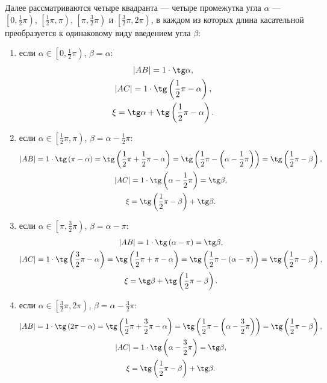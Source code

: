 Далее рассматриваются четыре квадранта --- четыре промежутка угла $\alpha$ --- $\left [ 0, \frac{1}{2} \pi \right )$, $\left [ \frac{1}{2} \pi, \pi \right )$,
$\left [ \pi, \frac{3}{2} \pi \right )$ и $\left [ \frac{3}{2} \pi, 2 \pi \right )$, в каждом из которых длина касательной преобразуется к одинаковому виду введением
угла $\beta$:
\begin{enumerate}
    \item если $\alpha \in \left [ 0, \frac{1}{2} \pi \right )$, $\beta = \alpha$:
    \begin{gather}
        \modulus{AB} = 1 \cdot \tg \alpha, \\
        \modulus{AC} = 1 \cdot \tg \left ( \frac{1}{2} \pi - \alpha \right ) , \\
        \xi = \tg \alpha + \tg \left ( \frac{1}{2} \pi - \alpha \right ).
    \end{gather}

    \item если $\alpha \in \left [ \frac{1}{2} \pi, \pi \right )$, $\beta = \alpha - \frac{1}{2} \pi$:
    \begin{gather}
        \modulus{AB} = 1 \cdot \tg \left ( \pi - \alpha \right ) = \tg \left ( \frac{1}{2} \pi + \frac{1}{2} \pi - \alpha \right ) = \tg \left ( \frac{1}{2} \pi - \left ( \alpha - \frac{1}{2} \pi \right ) \right ) = \tg \left ( \frac{1}{2} \pi - \beta \right ), \\
        \modulus{AC} = 1 \cdot \tg \left ( \alpha - \frac{1}{2} \pi \right ) = \tg \beta , \notag \\
        \xi = \tg \left ( \frac{1}{2} \pi - \beta \right ) + \tg \beta.
    \end{gather}

    \item если $\alpha \in \left [ \pi, \frac{3}{2} \pi \right )$, $\beta = \alpha - \pi$:
    \begin{gather}
        \modulus{AB} = 1 \cdot \tg \left ( \alpha - \pi \right ) = \tg \beta, \\
        \modulus{AC} = 1 \cdot \tg \left ( \frac{3}{2} \pi - \alpha \right ) = \tg \left ( \frac{1}{2} \pi + \pi - \alpha \right ) = \tg \left ( \frac{1}{2} \pi - \left ( \alpha - \pi \right ) \right ) = \tg \left ( \frac{1}{2} \pi - \beta \right ) , \\
        \xi = \tg \beta + \tg \left ( \frac{1}{2} \pi - \beta \right ).
    \end{gather}

    \item если $\alpha \in \left [ \frac{3}{2} \pi, 2 \pi \right )$, $\beta = \alpha - \frac{3}{2} \pi$:
    \begin{gather}
        \modulus{AB} = 1 \cdot \tg \left ( 2 \pi - \alpha \right ) = \tg \left ( \frac{1}{2} \pi + \frac{3}{2} \pi - \alpha \right ) = \tg \left ( \frac{1}{2} \pi - \left ( \alpha - \frac{3}{2} \pi \right ) \right ) = \tg \left ( \frac{1}{2} \pi - \beta \right ), \\
        \modulus{AC} = 1 \cdot \tg \left ( \alpha - \frac{3}{2} \pi \right ) = \tg \beta , \\
        \xi = \tg \left ( \frac{1}{2} \pi - \beta \right ) + \tg \beta.
    \end{gather}
\end{enumerate}
